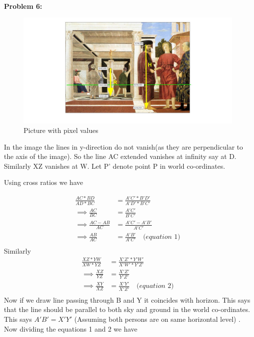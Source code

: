 \documentclass[a4paper]{article}
\begin{document}
\hrulefill\\


\textbf{\newline Problem 6:}

\begin{figure}[ht!]
 \centering
\caption{Picture with pixel values}
\includegraphics[width=1\textwidth]{Q6/measuredpicture.jpg}
\end{figure}

In the image the lines in y-direction do not vanish(as they are perpendicular to the axis of the image). So the line AC extended vanishes at infinity say at D. Similarly XZ vanishes at W. Let P' denote point P in world co-ordinates.

Using cross ratios we have

\begin{equation*} 
\begin{split}
 \frac{AC*BD}{AD*BC} &= \frac{A'C'*B'D'}{A'D'*B'C'} \\
\implies  \frac{AC}{BC} &=  \frac{A'C'}{B'C'} \\
\implies  \frac{AC-AB}{AC} &=  \frac{A'C'-A'B'}{A'C'} \\
\implies \frac{AB}{AC} &=  \frac{A'B'}{A'C'} \quad \textit{(equation 1)} \\
 \end{split}
\end{equation*}
Similarly
\begin{equation*} 
\begin{split}
 \frac{XZ*YW}{XW*YZ} &= \frac{X'Z'*Y'W'}{X'W'*Y'Z'} \\
\implies  \frac{XZ}{YZ} &=  \frac{X'Z'}{Y'Z'} \\
\implies  \frac{XY}{XZ} &=  \frac{X'Y'}{X'Z'} \quad \textit{(equation 2)}\\
 \end{split}
\end{equation*}
Now if we draw line passing through B and Y it coincides with horizon. This says that the line should be parallel to both sky and ground in the world co-ordinates. This says $ A'B' = X'Y' $ (Assuming both persons are on same horizontal level) . Now dividing the equations 1 and 2 we have
 
\end{document}

